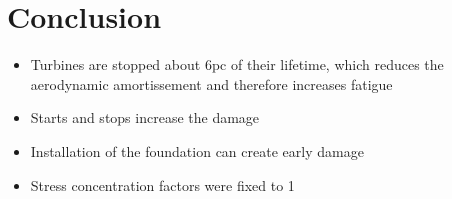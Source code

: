 \newpage
\section{Conclusion}


\begin{itemize}
    \item Turbines are stopped about 6pc of their lifetime, which reduces the aerodynamic amortissement and therefore increases fatigue
    \item Starts and stops increase the damage
    \item Installation of the foundation can create early damage
    \item Stress concentration factors were fixed to 1
\end{itemize}


